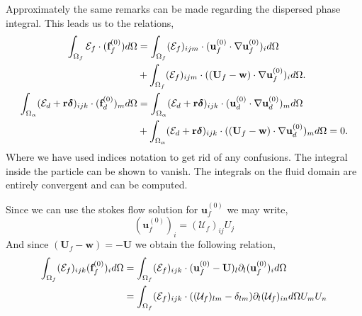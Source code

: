 Approximately the same remarks can be made regarding the  dispersed phase integral.
This leads us to the relations, 
\begin{align*}
    \int_{\Omega_f} \mathcal{E}_f \cdot  (\textbf{f}^{(0)}_f) d\Omega
    &=
    \int_{\Omega_f} (\mathcal{E}_f)_{ijm} \cdot (\textbf{u}_f^{(0)}\cdot \mathbf{\nabla} \textbf{u}_f^{(0)})_i d\Omega\\
    &+ \int_{\Omega_f} (\mathcal{E}_f)_{ijm} \cdot ((\textbf{U}_f - \textbf{w})\cdot \mathbf{\nabla} \textbf{u}_f^{(0)})_i d\Omega.\\
    \int_{\Omega_{\alpha}} (\mathcal{E}_d + \textbf{r}\bm\delta)_{ijk} \cdot (\textbf{f}_d^{(0)})_m d\Omega
    &=
    \int_{\Omega_{\alpha}} (\mathcal{E}_d + \textbf{r}\bm\delta)_{ijk} \cdot (\textbf{u}_d^{(0)}\cdot \mathbf{\nabla} \textbf{u}_d^{(0)})_m d\Omega\\
    &+ \int_{\Omega_{\alpha}} (\mathcal{E}_d + \textbf{r}\bm\delta)_{ijk} \cdot ((\textbf{U}_f - \textbf{w})\cdot \mathbf{\nabla} \textbf{u}_d^{(0)})_m d\Omega
    =0.
\end{align*}
Where we have used indices notation to get rid of any confusions. 
The integral inside the particle can be shown to vanish. 
The integrals on the fluid domain are entirely convergent and can be computed. 

Since we can use the stokes flow solution for $\textbf{u}^{(0)}_f$ we may write, 
\begin{equation}
    (\textbf{u}^{(0)}_f)_i = (\mathcal{U}_f)_{ij} U_j
\end{equation}
And since $(\textbf{U}_f - \textbf{w}) = - \textbf{U}$ we obtain the following relation, 
\begin{align}
    \int_{\Omega_f} (\mathcal{E}_f)_{ijk} (\textbf{f}^{(0)}_f)_i  d\Omega
    &= 
    \int_{\Omega_f} (\mathcal{E}_f)_{ijk} \cdot (\textbf{u}_f^{(0)} - \textbf{U})_l \partial_l (\textbf{u}_f^{(0)})_i d\Omega\\
    &=
    \int_{\Omega_f} (\mathcal{E}_f)_{ijk} \cdot ((\mathcal{U}_f)_{lm} - \delta_{lm}) \partial_l (\mathcal{U}_f)_{in}  d\Omega
    U_m U_n
\end{align}

